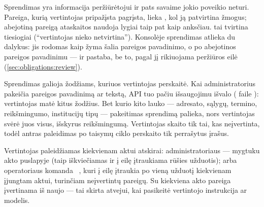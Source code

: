 Sprendimas yra informacija peržiūrėtojui ir pats savaime jokio poveikio neturi. Pareiga, kurią
vertintojas pripažįsta pagrįsta, lieka , kol ją patvirtina žmogus; abejotiną
pareigą ataskaitos naudoja lygiai taip pat kaip anksčiau. 
tai tvirtina tiesiogiai (\enquote{vertintojas nieko netvirtina}). Konsolėje sprendimas atlieka du
dalykus: jis rodomas kaip žyma šalia pareigos pavadinimo, o po abejotinos pareigos pavadinimu --- ir
pastaba, be to, pagal jį rikiuojama peržiūros eilė (\cref{sec:obligations:review}).

Sprendimas galioja žodžiams, kuriuos vertintojas perskaitė. Kai administratorius pakeičia
pareigos pavadinimą ar tekstą, API tuo pačiu išsaugojimu išvalo 
( faile ): vertintojas matė kitus
žodžius. Bet kurio kito lauko --- adresato, sąlygų, termino, reikšmingumo, institucijų tipų ---
pakeitimas sprendimą palieka, nors vertintojas svėrė juos visus, išskyrus reikšmingumą.
Vertintojas skaito tik tai, kas neįvertinta, todėl antras paleidimas po taisymų ciklo perskaito
tik perrašytus įrašus.

Vertintojas paleidžiamas kiekvienam aktui atskirai: administratoriaus --- mygtuku
 akto puslapyje (taip iškviečiamas
 ir į eilę įtraukiama
 rūšies užduotis); arba operatoriaus komanda
~, kuri į eilę įtraukia po vieną užduotį kiekvienam
įjungtam aktui, turinčiam neįvertintų pareigų. Su  kiekviena akto pareiga įvertinama
iš naujo --- tai skirta atvejui, kai pasikeitė vertintojo instrukcija ar modelis.

